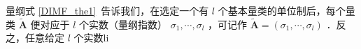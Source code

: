 
量纲式
\autoref{DIMF_the1}~告诉我们，在选定一个有 $l$ 个基本量类的单位制后，每个量类 $\tilde{\boldsymbol{A}}$ 便对应于 $l$ 个实数（量纲指数） $\sigma_1,\cdots,\sigma_l$ ，可记作 $\tilde{\boldsymbol{A}}=(\sigma_1,\cdots,\sigma_l)$ ．反之，任意给定 $l$ 个实数li